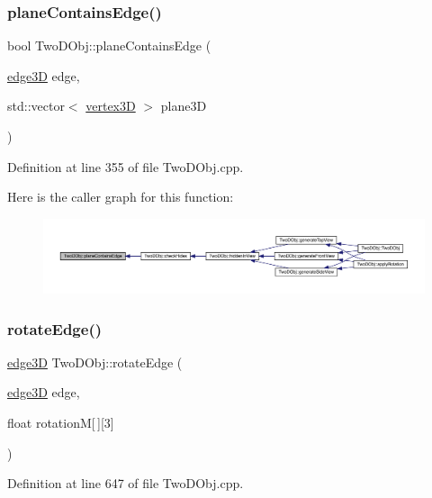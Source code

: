 \subsubsection{\texorpdfstring{plane\+Contains\+Edge()}{planeContainsEdge()}}
{\footnotesize\ttfamily bool Two\+D\+Obj\+::plane\+Contains\+Edge (\begin{DoxyParamCaption}\item[{\mbox{\hyperlink{structedge3_d}{edge3D}}}]{edge,  }\item[{std\+::vector$<$ \mbox{\hyperlink{structvertex3_d}{vertex3D}} $>$}]{plane3D }\end{DoxyParamCaption})}



Definition at line 355 of file Two\+D\+Obj.\+cpp.

Here is the caller graph for this function\+:
\nopagebreak
\begin{figure}[H]
\begin{center}
\leavevmode
\includegraphics[width=350pt]{class_two_d_obj_ab9d3420793d260703d8882196efccfc9_icgraph}
\end{center}
\end{figure}
\mbox{\label{class_two_d_obj_af24bd21a8a1319b6d075537e895d7f4f}} 
\subsubsection{\texorpdfstring{rotate\+Edge()}{rotateEdge()}}
{\footnotesize\ttfamily \mbox{\hyperlink{structedge3_d}{edge3D}} Two\+D\+Obj\+::rotate\+Edge (\begin{DoxyParamCaption}\item[{\mbox{\hyperlink{structedge3_d}{edge3D}}}]{edge,  }\item[{float}]{rotationM\mbox{[}$\,$\mbox{]}\mbox{[}3\mbox{]} }\end{DoxyParamCaption})}



Definition at line 647 of file Two\+D\+Obj.\+cpp.

